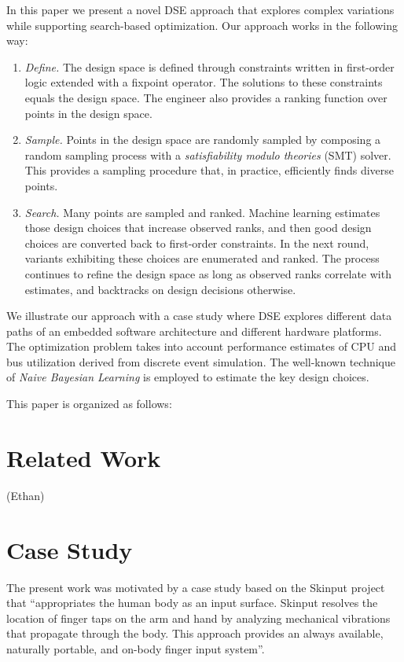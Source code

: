 \documentclass[conference]{IEEEtran}
\begin{document}
In this paper we present a novel DSE approach that explores complex variations while supporting search-based optimization. Our approach works in the following way:
\begin{enumerate}
\item \textit{Define.} The design space is defined through constraints written in first-order logic extended with a fixpoint operator. The solutions to these constraints equals the design space. The engineer also provides a ranking function over points in the design space. 
\item \textit{Sample.} Points in the design space are randomly sampled by composing a random sampling process with a \textit{satisfiability modulo theories} (SMT) solver. This provides a sampling procedure that, in practice, efficiently finds diverse points.
\item \textit{Search.} Many points are sampled and ranked. Machine learning estimates those design choices that increase observed ranks, and then good design choices are converted back to first-order constraints. In the next round, variants exhibiting these choices are enumerated and ranked. The process continues to refine the design space as long as observed ranks correlate with estimates, and backtracks on design decisions otherwise.
\end{enumerate}

We illustrate our approach with a case study where DSE explores different data paths of an embedded software architecture and different hardware platforms. The optimization problem takes into account performance estimates of CPU and bus utilization derived from discrete event simulation. The well-known technique of \textit{Naive Bayesian Learning} is employed to estimate the key design choices. 

This paper is organized as follows: 

\section{Related Work}
(Ethan)

\section{Case Study}

The present work was motivated by a case study based on the Skinput project \cite{?} that ``appropriates the human body as an input surface. Skinput resolves the location of finger taps on the arm and hand by analyzing mechanical vibrations that propagate through the body. This approach provides an always available, naturally portable, and on-body finger input system''.
\end{document}
